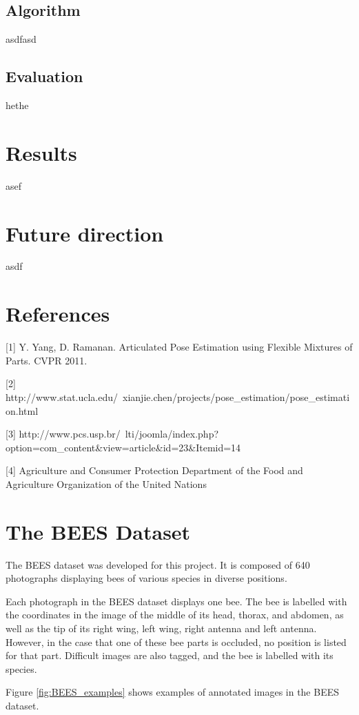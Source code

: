 \documentclass[11pt, oneside]{report}
\begin{document}
\section{Algorithm}
asdfasd

\section{Evaluation}
hethe

\chapter{Results}
asef

\chapter{Future direction}

asdf

\chapter{References}
[1] Y. Yang, D. Ramanan. Articulated Pose Estimation using Flexible Mixtures of Parts. CVPR 2011.

[2] http://www.stat.ucla.edu/~xianjie.chen/projects/pose\_estimation/pose\_estimation.html

[3] http://www.pcs.usp.br/~lti/joomla/index.php?option=com\_content\&view=article\&id=23\&Itemid=14

[4] Agriculture and Consumer Protection Department of the Food and Agriculture Organization of the United Nations


\appendix
\chapter{The BEES Dataset}
    The BEES dataset was developed for this project. It is composed of 640 photographs displaying bees of various species in diverse positions.

    Each photograph in the BEES dataset displays one bee. The bee is labelled with the coordinates in the image of the middle of its head, thorax, and abdomen, as well as the tip of its right wing, left wing, right antenna and left antenna. However, in the case that one of these bee parts is occluded, no position is listed for that part. Difficult images are also tagged, and the bee is labelled with its species.

    Figure \ref{fig:BEES_examples} shows examples of annotated images in the BEES dataset.
\end{document}
